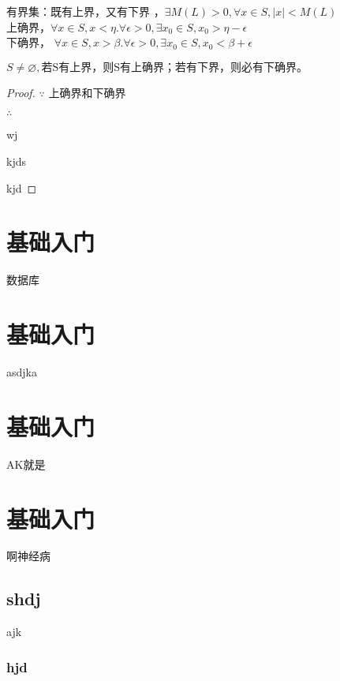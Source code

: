 \begin{definition}[有界定义] \label{def:part10002}
	有界集：既有上界，又有下界 ，$\exists M(L) >0 ,\forall x\in S, |x |<M(L)$\\
	
	上确界，$\forall x \in S ,x<\eta . \forall \epsilon >0 , \exists x_0 \in S ,x_0 > \eta - \epsilon $ \\
	
	下确界， $\forall x \in S ,x>\beta . \forall \epsilon >0 , \exists x_0 \in S ,x_0  <\beta + \epsilon $ \\
	
\end{definition}	

\begin{theorem}[确界定理] \label{theorem:0001}
	$S \ne \varnothing , \text{若S有上界，则S有上确界；若有下界，则必有下确界。}$
\end{theorem}

\begin{proof}
	
	$\because$ 上确界和下确界
	
	$\therefore$
	
	\so wj 
	
	\so kjds
	
	\be kjd
\end{proof}
\section{基础入门}
数据库

\section{基础入门}
asdjka

\section{基础入门}
AK就是
\section{基础入门}

啊神经病
	\subsection{shdj}
	ajk
\subsubsection{hjd}

